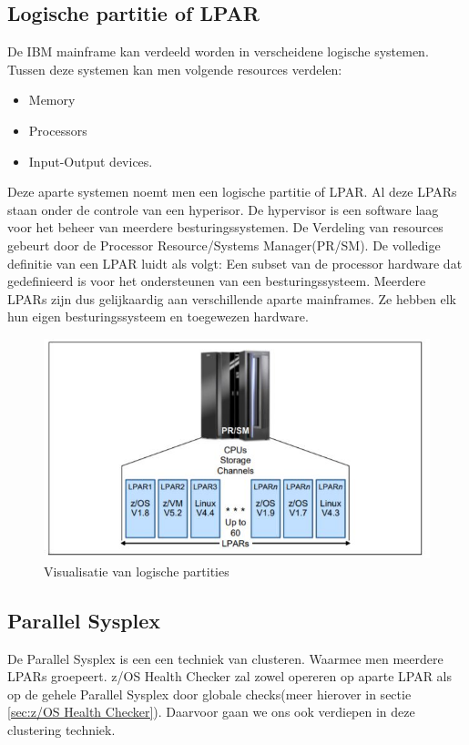\subsection{Logische partitie of LPAR}
\label{subsec:Logische partitie of LPAR}
De IBM mainframe kan verdeeld worden in verscheidene logische systemen. Tussen deze systemen kan men volgende resources verdelen:
\begin{itemize}
	\item Memory
	\item Processors
	\item Input-Output devices.
\end{itemize}
Deze aparte systemen noemt men een logische partitie of LPAR. Al deze LPARs staan onder de controle van een hyperisor. De hypervisor is een software laag voor het beheer van meerdere besturingssystemen. De Verdeling van resources gebeurt door de Processor Resource/Systems Manager(PR/SM). De volledige definitie van een LPAR luidt als volgt: Een subset van de processor hardware dat gedefinieerd is voor het ondersteunen van een besturingssysteem. Meerdere LPARs zijn dus gelijkaardig aan verschillende aparte mainframes. Ze hebben elk hun eigen besturingssysteem en toegewezen hardware. \cite{Ebbers2011}

\begin{figure}[h]
	\centering
	\includegraphics{img/LPAR}
	\caption[Logische Partities]{Visualisatie van logische partities}
	\label{fig:lpar}
\end{figure}


\subsection{Parallel Sysplex}
\label{subsec:Parallel Sysplex}

De Parallel Sysplex is een een techniek van clusteren. Waarmee men meerdere LPARs groepeert.  z/OS Health Checker zal zowel opereren op aparte LPAR als op de gehele Parallel Sysplex door globale checks(meer hierover in sectie \ref{sec:z/OS Health Checker}). Daarvoor gaan we ons ook verdiepen in deze clustering techniek.

